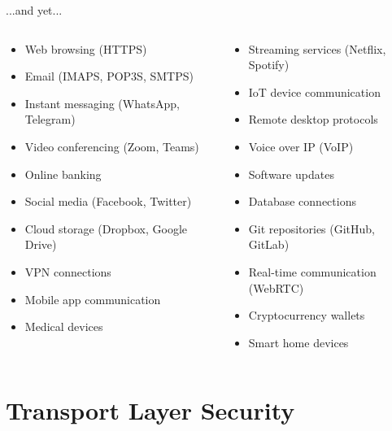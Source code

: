 \documentclass[aspectratio=169, lualatex, handout]{beamer}
\begin{document}
\begin{frame}{...and yet...}
	\begin{columns}[c]
		\begin{column}{0.5\textwidth}
			\begin{itemize}[<+->]
				\item Web browsing (HTTPS)
				\item Email (IMAPS, POP3S, SMTPS)
				\item Instant messaging (WhatsApp, Telegram)
				\item Video conferencing (Zoom, Teams)
				\item Online banking
				\item Social media (Facebook, Twitter)
				\item Cloud storage (Dropbox, Google Drive)
				\item VPN connections
				\item Mobile app communication
				\item Medical devices
			\end{itemize}
		\end{column}
		\begin{column}{0.5\textwidth}
			\begin{itemize}[<+->]
				\item Streaming services (Netflix, Spotify)
				\item IoT device communication
				\item Remote desktop protocols
				\item Voice over IP (VoIP)
				\item Software updates
				\item Database connections
				\item Git repositories (GitHub, GitLab)
				\item Real-time communication (WebRTC)
				\item Cryptocurrency wallets
				\item Smart home devices
			\end{itemize}
		\end{column}
	\end{columns}
\end{frame}

\section{Transport Layer Security}
\end{document}
